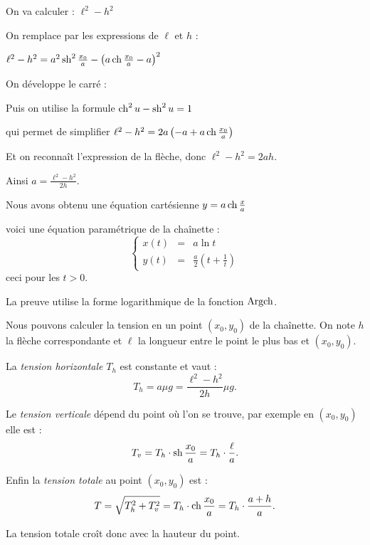 On va calculer :
$\ell^2 - h^2$

\change
On remplace par les expressions  de $\ell$ et $h$ :

$\ell^2 - h^2 = a^2 \mathop{\mathrm{sh}}\nolimits^2 \tfrac{x_0}{a} - \left( a \mathop{\mathrm{ch}}\nolimits \tfrac{x_0}{a} - a \right)^2$

\change
On développe le carré :
    
\change
Puis on utilise la formule $\mathop{\mathrm{ch}}\nolimits^2 u - \mathop{\mathrm{sh}}\nolimits^2 u = 1$

qui permet de simplifier 
$\ell^2 - h^2 = 2a\left(-a+a \mathop{\mathrm{ch}}\nolimits \tfrac{x_0}{a} \right)$
  
\change
Et on reconnaît l'expression de la flèche,
donc $\ell^2 - h^2 =2ah$. 

\change

Ainsi $\displaystyle a = \frac{\ell^2-h^2}{2h}$.


\diapo

Nous avons obtenu une équation cartésienne $y= a \mathop{\mathrm{ch}}\nolimits \frac x a$

voici une équation paramétrique de la chaînette :
$$\left\{
\begin{array}{rcl}
x(t) &=& a \ln t \\
y(t) &=& \frac a 2 \left(t+\frac 1 t\right)
\end{array}
\right.
$$
ceci pour les $t>0$.

La preuve utilise la forme logarithmique de la fonction $\mathop{\mathrm{Argch}}\nolimits$.


\diapo

Nous pouvons calculer la tension en un point $(x_0,y_0)$ de la chaînette.
On note $h$ la flèche correspondante et $\ell$ la longueur entre le point le plus bas et $(x_0,y_0)$.

\change

La \emph{tension horizontale} $T_h$ est constante et vaut :
  $$T_h = a \mu g = \frac{\ell^2-h^2}{2h} \mu g.$$

 
\change 
Le \emph{tension verticale} dépend du point où l'on se trouve,
par exemple en $(x_0,y_0)$ elle est : $$T_v= T_h \cdot \mathop{\mathrm{sh}}\nolimits \frac{x_0}{a} = T_h \cdot \frac \ell a.$$
  
\change
Enfin la \emph{tension totale} au point $(x_0,y_0)$ est :
  $$T = \sqrt{T_h^2+T_v^2} = T_h \cdot \mathop{\mathrm{ch}}\nolimits \frac{x_0}{a} 
  = T_h \cdot \frac{a+h}{a}.$$

La tension totale croît donc avec la hauteur du point.



